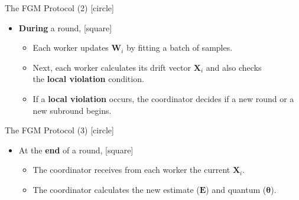 \begin{frame}{The FGM Protocol (2)}
    [circle]
    \begin{itemize}
        \item{\textbf{During} a round,
        \vspace{0.2cm}
        [square]
        \begin{itemize}
            \item{Each worker updates $\pmb{W}_i$ by fitting a batch of samples.}
            \vspace{0.3cm}
            \item{Next, each worker calculates its drift vector $\pmb{X}_i$ and also checks\\the \textbf{local violation} condition.}
            \vspace{0.3cm}
            \item{If a \textbf{local violation} occurs, the coordinator decides if a new round or a new subround begins.}
        \end{itemize}
        }
    \end{itemize}
\end{frame}

\begin{frame}{The FGM Protocol (3)}
    [circle]
    \begin{itemize}
        \item{At the \textbf{end} of a round,
        \vspace{0.2cm}
        [square]
        \begin{itemize}
            \item{The coordinator receives from each worker the current $\pmb{X}_i$.}
            \vspace{0.3cm}
            \item{The coordinator calculates the new estimate ($\pmb{E}$) and quantum ($\pmb{\theta}$).}
        \end{itemize}
        }
    \end{itemize}
\end{frame}

